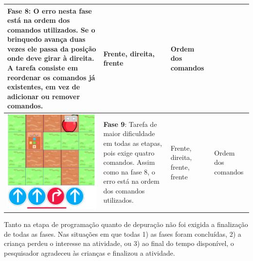 \begin{quadro}
\begin{longtable}{ | m{} | m{} | m{} | m{} |}
         \textbf{Fase 8}:
         O erro nesta fase está na ordem dos comandos utilizados. Se o brinquedo avança duas vezes ele passa da posição onde deve girar à direita. A tarefa consiste em reordenar os comandos já existentes, em vez de adicionar ou remover comandos. &
 
         Frente, direita, frente & Ordem dos comandos
         
         \\ \hline
     
     
         \includegraphics[width=.9\linewidth]{figs/debug/4.png} &
     
         \textbf{Fase 9}: 
         Tarefa de maior dificuldade em todas as etapas, pois exige quatro comandos. Assim como na fase 8, o erro está na ordem dos comandos utilizados.
         &
         Frente, direita, frente, frente & Ordem dos comandos
         
         \\ \hline
     

    \end{longtable}
\end{quadro}

Tanto na etapa de programação quanto de depuração não foi exigida a finalização de todas as fases. Nas situações em que todas 1) as fases foram concluídas, 2) a criança perdeu o interesse na atividade, ou 3) ao final do tempo disponível, o pesquisador agradeceu às crianças e finalizou a atividade.

